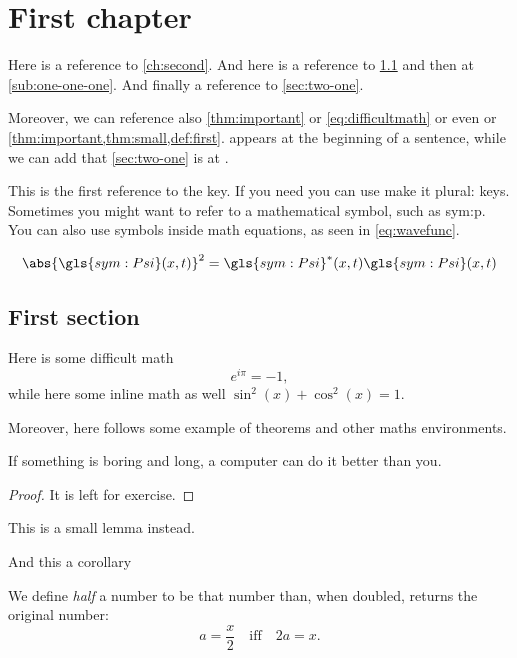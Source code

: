 \chapter{First chapter}
Here is a reference to \cref{ch:second}. And here is a reference to \cref{sec:one-one} and then at \cref{sub:one-one-one}. And finally a reference to \cref{sec:two-one}.

Moreover, we can reference also \cref{thm:important} or \cref{eq:difficultmath} or even  or \cref{thm:important,thm:small,def:first}.  appears at the beginning of a sentence, while we can add that \cref{sec:two-one} is at .

This is the first reference to the \gls{key}. If you need you can use make it plural: \glspl{key}. Sometimes you might want to refer to a mathematical symbol, such as \gls{sym:p}. You can also use symbols inside math equations, as seen in \eqref{eq:wavefunc}.

\begin{equation}
	\abs{\gls{sym:Psi}(x,t)}^2 = \gls{sym:Psi}^\ast(x,t) \gls{sym:Psi}(x,t) \label{eq:wavefunc}
\end{equation}

\lipsum[1-3]

\section{First section}\label{sec:one-one}
Here is some difficult math
\begin{equation}\label{eq:difficultmath}
    e^{i\pi} = - 1,
\end{equation}
while here some inline math as well $\sin^2(x) + \cos^2(x) = 1$.

Moreover, here follows some example of theorems and other maths environments.
\begin{theorem}\label{thm:important}
    If something is boring and long, a computer can do it better than you.
\end{theorem}
\begin{proof}
    It is left for exercise.
\end{proof}

\begin{lemma}\label{thm:small}
    This is a small lemma instead.
\end{lemma}
\begin{corollary}\label{thm:corollary}
    And this a corollary
\end{corollary}
\begin{definition}\label{def:first}
    We define \emph{half} a number to be that number than, when doubled, returns the original number:
    \begin{equation}
        a = \frac{x}{2} \quad \text{iff} \quad 2a = x.
    \end{equation}
\end{definition}

